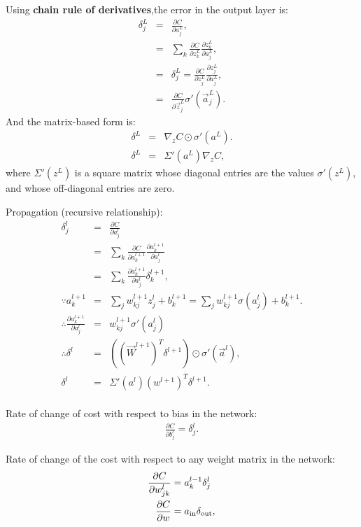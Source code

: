 Using \textbf{chain rule of derivatives},the error in the output layer is:
\begin{eqnarray} 
\delta^L_j &=& \frac{\partial C}{\partial a^L_j}, \\
&=& \sum_k \frac{\partial C}{\partial z^L_k} \frac{\partial z^L_k}{\partial a^L_j}, \\
&=& \delta^L_j = \frac{\partial C}{\partial z^L_j} \frac{\partial z^L_j}{\partial a^L_j}, \\
&=& \frac{\partial C}{\partial \vec{z}^L_j} \sigma'(\vec{a}^L_j).
\end{eqnarray}
And the matrix-based form is:
\begin{eqnarray} 
\delta^L & = & \nabla_z C \odot \sigma'(a^L). \\
\delta^L & = &\Sigma'(a^L) \nabla_z C,
\end{eqnarray}
where $\Sigma'(z^L)$ is a square matrix whose diagonal entries are the values $\sigma'(z^L)$, and whose off-diagonal entries are zero.

Propagation (recursive relationship):
\begin{eqnarray} 
\delta_j^l & = & \frac{\partial C}{\partial a^l_j}\\
& = & \sum_k \frac{\partial C}{\partial a^{l+1}_k} \frac{\partial a^{l+1}_k}{\partial a^l_j}\\ 
& = & \sum_k \frac{\partial a^{l+1}_k}{\partial a^l_j} \delta^{l+1}_k, \\
\because a^{l+1}_k &=& \sum_j w^{l+1}_{kj} z^l_j +b^{l+1}_k = \sum_j w^{l+1}_{kj} \sigma(a^l_j) +b^{l+1}_k. \\
\therefore \frac{\partial a^{l+1}_k}{\partial a^l_j} &=& w^{l+1}_{kj} \sigma'(a^l_j) \\
\therefore
\delta^l &=& ((\vec{W}^{l+1})^T \delta^{l+1}) \odot \sigma'(\vec{a}^l), \\
\delta^l &=& \Sigma'(a^l) (w^{l+1})^T \delta^{l+1}.\\
\end{eqnarray}

Rate of change of cost with respect to bias in the network:
\begin{eqnarray}  \frac{\partial C}{\partial b^l_j} =
\delta^l_j.
\end{eqnarray}

Rate of change of the cost with respect to any weight matrix in the network:
\begin{align}
\frac{\partial C}{\partial w^l_{jk}} &= a^{l-1}_k \delta^l_j \\
\frac{\partial C}{\partial w} &= a_{\rm in} \delta_{\rm out},
\end{align}

